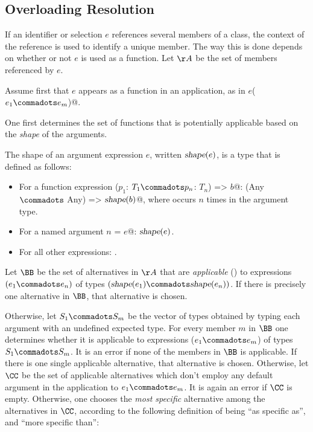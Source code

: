 \subsection{Overloading Resolution}
\label{sec:overloading-resolution}

If an identifier or selection $e$ references several members of a
class, the context of the reference is used to identify a unique
member.  The way this is done depends on whether or not $e$ is used as
a function. Let $\AA$ be the set of members referenced by $e$.

Assume first that $e$ appears as a function in an application, as in
\lstinline@$e$($e_1 \commadots e_m$)@.  

One first determines the set of functions that is potentially
applicable based on the {\em shape} of the arguments.

\newcommand{\shape}{\mbox{\sl shape}}

The shape of an argument expression $e$, written  $\shape(e)$, is
a type that is defined as follows:
\begin{itemize}
\item 
For a function expression \lstinline@($p_1$: $T_1 \commadots p_n$: $T_n$) => $b$@:
\lstinline@(Any $\commadots$ Any) => $\shape(b)$@, where \lstinline@Any@ occurs $n$ times
in the argument type.
\item
For a named argument \lstinline@$n$ = $e$@: $\shape(e)$.
\item
For all other expressions: \lstinline@Nothing@.
\end{itemize}

Let $\BB$ be the set of alternatives in $\AA$ that are {\em applicable} ()
to expressions $(e_1 \commadots e_n)$ of types
$(\shape(e_1) \commadots \shape(e_n))$.
If there is precisely one
alternative in $\BB$, that alternative is chosen.

Otherwise, let $S_1 \commadots S_m$ be the vector of types obtained by
typing each argument with an undefined expected type.  For every
member $m$ in $\BB$ one determines whether it is 
applicable to expressions ($e_1 \commadots e_m$) of types $S_1
\commadots S_m$.
It is an error if none of the members in $\BB$ is applicable. If there is one
single applicable alternative, that alternative is chosen. Otherwise, let $\CC$
be the set of applicable alternatives which don't employ any default argument
in the application to $e_1 \commadots e_m$. It is again an error if $\CC$ is empty.
Otherwise, one chooses the {\em most specific} alternative among the alternatives
in $\CC$, according to the following definition of being ``as specific as'', and
``more specific than'':

